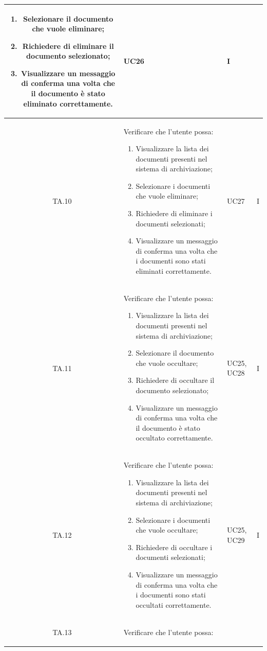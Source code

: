 \begin{xltabular}{\textwidth}{|c|X|p{2.5cm}|c|}
\begin{enumerate}
    \item Selezionare il documento che vuole eliminare;
    \item Richiedere di eliminare il documento selezionato;
    \item Visualizzare un messaggio di conferma una volta che il documento è stato eliminato correttamente.
\end{enumerate}
& UC26 & I \\
\hline
TA.10 & Verificare che l'utente possa:
\begin{enumerate}
    \item Visualizzare la lista dei documenti presenti nel sistema di archiviazione;
    \item Selezionare i documenti che vuole eliminare;
    \item Richiedere di eliminare i documenti selezionati;
    \item Visualizzare un messaggio di conferma una volta che i documenti sono stati eliminati correttamente.
\end{enumerate}
& UC27 & I \\
\hline
TA.11 & Verificare che l'utente possa:
\begin{enumerate}
    \item Visualizzare la lista dei documenti presenti nel sistema di archiviazione;
    \item Selezionare il documento che vuole occultare;
    \item Richiedere di occultare il documento selezionato;
    \item Visualizzare un messaggio di conferma una volta che il documento è stato occultato correttamente.
\end{enumerate}
& UC25, UC28 & I \\
\hline
TA.12 & Verificare che l'utente possa:
\begin{enumerate}
    \item Visualizzare la lista dei documenti presenti nel sistema di archiviazione;
    \item Selezionare i documenti che vuole occultare;
    \item Richiedere di occultare i documenti selezionati;
    \item Visualizzare un messaggio di conferma una volta che i documenti sono stati occultati correttamente.
\end{enumerate}
& UC25, UC29 & I \\
\hline
TA.13 & Verificare che l'utente possa:
\begin{enumerate}

\end{enumerate}
\end{xltabular}
